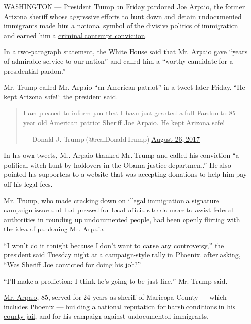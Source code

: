 WASHINGTON --- President Trump on Friday pardoned Joe Arpaio, the former
Arizona sheriff whose aggressive efforts to hunt down and detain
undocumented immigrants made him a national symbol of the divisive
politics of immigration and earned him a
\href{https://www.nytimes3xbfgragh.onion/2017/07/31/us/sheriff-joe-arpaio-convicted-arizona.html}{criminal
contempt conviction}.

In a two-paragraph statement, the White House said that Mr. Arpaio gave
``years of admirable service to our nation'' and called him a ``worthy
candidate for a presidential pardon.''

Mr. Trump called Mr. Arpaio ``an American patriot'' in a tweet later
Friday. ``He kept Arizona safe!'' the president said.

\begin{quote}
I am pleased to inform you that I have just granted a full Pardon to 85
year old American patriot Sheriff Joe Arpaio. He kept Arizona safe!

--- Donald J. Trump (@realDonaldTrump)
\href{https://twitter.com/realDonaldTrump/status/901263061511794688?ref_src=twsrc\%5Etfw}{August
26, 2017}
\end{quote}

In his own tweets, Mr. Arpaio thanked Mr. Trump and called his
conviction ``a political witch hunt by holdovers in the Obama justice
department.'' He also pointed his supporters to a website that was
accepting donations to help him pay off his legal fees.

Mr. Trump, who made cracking down on illegal immigration a signature
campaign issue and had pressed for local officials to do more to assist
federal authorities in rounding up undocumented people, had been openly
flirting with the idea of pardoning Mr. Arpaio.

``I won't do it tonight because I don't want to cause any controversy,''
the
\href{https://www.nytimes3xbfgragh.onion/2017/08/22/us/politics/trump-rally-arizona.html}{president
said Tuesday night at a campaign-style rally} in Phoenix, after asking,
``Was Sheriff Joe convicted for doing his job?''

``I'll make a prediction: I think he's going to be just fine,'' Mr.
Trump said.

\href{https://www.nytimes3xbfgragh.onion/2017/05/23/us/joe-arpaio-arizona.html}{Mr.
Arpaio}, 85, served for 24 years as sheriff of Maricopa County --- which
includes Phoenix --- building a national reputation for
\href{https://www.nytimes3xbfgragh.onion/2017/04/04/us/arpaio-tent-city-maricopa-sheriff-penzone.html}{harsh
conditions in his county jail}, and for his campaign against
undocumented immigrants.

